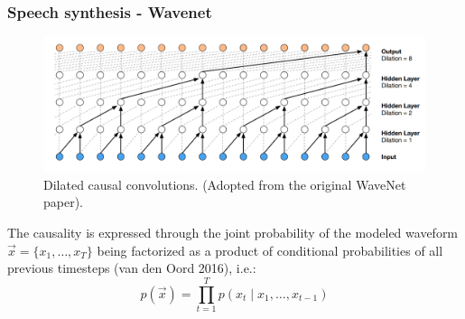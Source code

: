 \documentclass[a4paper,9pt]{beamer}
\theoremstyle{mytheoremstyle}
\begin{document}
\begin{frame}
\frametitle{Speech synthesis - Wavenet}
\begin{figure}
\begin{center}
  \includegraphics[width=\textwidth]{res/dilated_convolutions.png}
\end{center}
	\caption{Dilated causal convolutions. (Adopted from the original WaveNet paper).}
\end{figure}
The causality is expressed through the joint probability of the modeled waveform 
$\vec{x} = \{ x_1, \dots, x_T \}$
being factorized as a product of conditional probabilities of all previous timesteps (van den Oord 2016), i.e.:
\begin{equation}
p\left(\vec{x}\right) = \prod_{t=1}^{T} p\left(x_t \mid x_1, \dots ,x_{t-1}\right)
\end{equation}
\end{frame}
\end{document}
